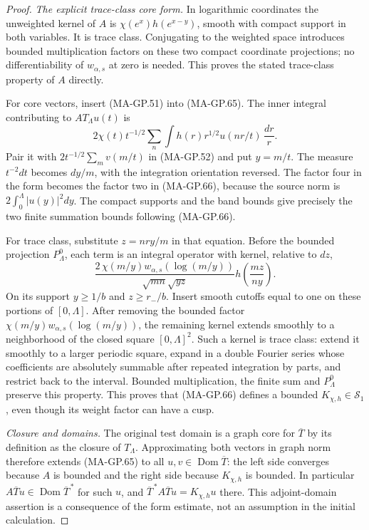 \begin{proof}
\emph{The explicit trace-class core form.}
In logarithmic coordinates the unweighted kernel of $A$ is
$\chi(e^x)h(e^{x-y})$, smooth with compact support in both
variables.  It is trace class.  Conjugating to the weighted
space introduces bounded multiplication factors on these
two compact coordinate projections; no differentiability of
$w_{\alpha,s}$ at zero is needed.  This proves the stated
trace-class property of $A$ directly.

For core vectors, insert (MA-GP.51) into (MA-GP.65).
The inner integral contributing to $AT_\Lambda u(t)$ is
\[
       2\chi(t)t^{-1/2}\sum_n
                   \int h(r)r^{1/2}u(nr/t)\,\frac{dr}{r}.
 \tag{MA-GP.70}
\]
Pair it with $2t^{-1/2}\sum_m v(m/t)$ in (MA-GP.52)
and put $y=m/t$.  The measure $t^{-2}dt$ becomes
$dy/m$, with the integration orientation reversed.
The factor four in the form becomes the factor two in
(MA-GP.66), because the source norm is
$2\int_0^\Lambda|u(y)|^2dy$.
The compact supports and the band bounds give precisely
the two finite summation bounds following (MA-GP.66).

For trace class, substitute $z=nry/m$ in that equation.
Before the bounded projection $P_\Lambda^0$, each term is
an integral operator with kernel, relative to $dz$,
\[
 \frac{2\,\chi(m/y)w_{\alpha,s}(\log(m/y))}
                        {\sqrt{mn}\sqrt{yz}}
                          h\!\left(\frac{mz}{ny}\right).
 \tag{MA-GP.71}
\]
On its support $y\ge1/b$ and $z\ge r_-/b$.
Insert smooth cutoffs equal to one on these portions of
$[0,\Lambda]$.  After removing the bounded factor
$\chi(m/y)w_{\alpha,s}(\log(m/y))$, the remaining kernel
extends smoothly to a neighborhood of the closed square
$[0,\Lambda]^2$.  Such a kernel is trace class: extend it
smoothly to a larger periodic square, expand in a double
Fourier series whose coefficients are absolutely summable
after repeated integration by parts, and restrict back to
the interval.  Bounded multiplication, the finite sum and
$P_\Lambda^0$ preserve this property.  This proves that
(MA-GP.66) defines a bounded $K_{\chi,h}\in\mathcal S_1$,
even though its weight factor can have a cusp.

\emph{Closure and domains.}
The original test domain is a graph core for $\overline T$
by its definition as the closure of $T_\Lambda$.
Approximating both vectors in graph norm therefore extends
(MA-GP.65) to all $u,v\in\operatorname{Dom}\overline T$:
the left side converges because $A$ is bounded and the right
side because $K_{\chi,h}$ is bounded.
In particular $A\overline T u\in\operatorname{Dom}\overline T^{\,*}$
for such $u$, and
$\overline T^{\,*}A\overline T u=K_{\chi,h}u$ there.
This adjoint-domain assertion is a consequence of the form
estimate, not an assumption in the initial calculation.


\end{proof}
